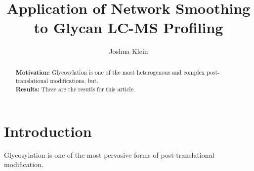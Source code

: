 \documentclass{article}
\begin{document}
\newcommand{\monosaccharide}[1]{{\bf #1}}
\newcommand{\nglycan}[0]{\textit{N}-glycan }
\newcommand{\nglycans}[0]{\textit{N}-glycans }

\newcommand{\agp}[0]{\textit{20150930-06-AGP} }
\newcommand{\phil}[0]{\textit{20141031-07-Phil-82} }
\newcommand{\philbs}[0]{\textit{20141101-04-Phil-BS} }
\newcommand{\igg}[0]{\textit{20151002-02-IGG} }
\newcommand{\dpphil}[0]{\textit{20141128-11-Phil-82} }
\newcommand{\dpagp}[0]{\textit{AGP-DR-Perm-glycans-1} }
\newcommand{\rpagp}[0]{\textit{AGP-permethylated-2ul-inj-55-SLens} }
\newcommand{\rphumanserum}[0]{\textit{Perm-BS-070111-04-Human-Serum} }


\title{Application of Network Smoothing to Glycan LC-MS Profiling}
\author{Joshua Klein}
\begin{abstract}
    \textbf{Motivation:} Glycosylation is one of the most heterogenous
    and complex post-translational modifications, but.\\
    \textbf{Results:} These are the resutls for this article.\\
\end{abstract}

\maketitle

\section{Introduction}
Glycosylation is one of the most pervasive forms of post-translational
modification.











\end{document}
